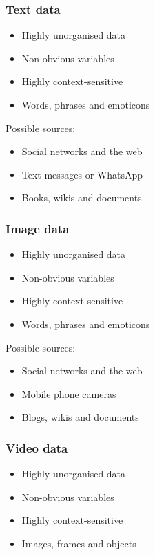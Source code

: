 \documentclass[11pt]{article}
\begin{document}
\subsubsection{Text data}
\label{sec:org139bdf5}
\begin{itemize}
\item Highly unorganised data
\item Non-obvious variables
\item Highly context-sensitive
\item Words, phrases and emoticons
\end{itemize}

Possible sources:
\begin{itemize}
\item Social networks and the web
\item Text messages or WhatsApp
\item Books, wikis and documents
\end{itemize}
\subsubsection{Image data}
\label{sec:orge7e40be}
\begin{itemize}
\item Highly unorganised data
\item Non-obvious variables
\item Highly context-sensitive
\item Words, phrases and emoticons
\end{itemize}

Possible sources:
\begin{itemize}
\item Social networks and the web
\item Mobile phone cameras
\item Blogs, wikis and documents
\end{itemize}
\subsubsection{Video data}
\label{sec:org89f1720}
\begin{itemize}
\item Highly unorganised data
\item Non-obvious variables
\item Highly context-sensitive
\item Images, frames and objects
\end{itemize}
\end{document}
